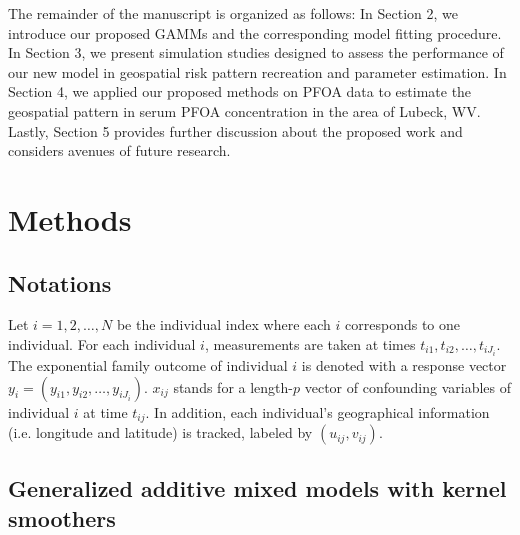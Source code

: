 	The remainder of the manuscript is organized as follows: In Section 2, we introduce our proposed GAMMs and the corresponding model fitting procedure. In Section 3, we present simulation studies designed to assess the performance of our new model in geospatial risk pattern recreation and parameter estimation. In Section 4, we applied our proposed methods on PFOA data to estimate the geospatial pattern in serum PFOA concentration in the area of Lubeck, WV. Lastly, Section 5 provides further discussion about the proposed work and considers avenues of future research.
	
	\section{Methods}
	\label{s:Methods}
	\subsection{Notations}
	Let $i=1,2,\dots,N$ be the individual index where each $i$ corresponds to one individual. For each individual $i$, measurements are taken at times $t_{i1}, t_{i2},\dots,t_{iJ_i}$. The exponential family outcome of individual $i$ is denoted with a response vector $y_i=(y_{i1}, y_{i2}, \dots, y_{iJ_i})$. $x_{ij}$ stands for a length-$p$ vector of confounding variables of individual $i$ at time $t_{ij}$. In addition, each individual's geographical information (i.e. longitude and latitude) is tracked, labeled by $(u_{ij},v_{ij})$. %
	
	
	\subsection{Generalized additive mixed models with kernel smoothers}
	
